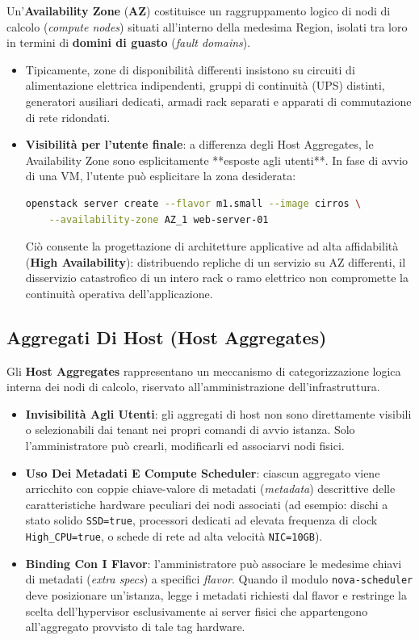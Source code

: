 \documentclass[11pt, a4paper]{article}
\begin{document}
Un'\textbf{Availability Zone} (\textbf{AZ}) costituisce un raggruppamento logico di nodi di calcolo (\emph{compute nodes}) situati all'interno della medesima Region, isolati tra loro in termini di \textbf{domini di guasto} (\emph{fault domains}).

\begin{itemize}
    \item Tipicamente, zone di disponibilità differenti insistono su circuiti di alimentazione elettrica indipendenti, gruppi di continuità (UPS) distinti, generatori ausiliari dedicati, armadi rack separati e apparati di commutazione di rete ridondati.
    \item \textbf{Visibilità per l'utente finale}: a differenza degli Host Aggregates, le Availability Zone sono esplicitamente **esposte agli utenti**. In fase di avvio di una VM, l'utente può esplicitare la zona desiderata:
    \begin{lstlisting}[language=bash]
openstack server create --flavor m1.small --image cirros \
    --availability-zone AZ_1 web-server-01
    \end{lstlisting}
    Ciò consente la progettazione di architetture applicative ad alta affidabilità (\textbf{High Availability}): distribuendo repliche di un servizio su AZ differenti, il disservizio catastrofico di un intero rack o ramo elettrico non compromette la continuità operativa dell'applicazione.
\end{itemize}

\subsection{Aggregati Di Host (Host Aggregates)}

Gli \textbf{Host Aggregates} rappresentano un meccanismo di categorizzazione logica interna dei nodi di calcolo, riservato all'amministrazione dell'infrastruttura.
\begin{itemize}
    \item \textbf{Invisibilità Agli Utenti}: gli aggregati di host non sono direttamente visibili o selezionabili dai tenant nei propri comandi di avvio istanza. Solo l'amministratore può crearli, modificarli ed associarvi nodi fisici.
    \item \textbf{Uso Dei Metadati E Compute Scheduler}: ciascun aggregato viene arricchito con coppie chiave-valore di metadati (\emph{metadata}) descrittive delle caratteristiche hardware peculiari dei nodi associati (ad esempio: dischi a stato solido \texttt{SSD=true}, processori dedicati ad elevata frequenza di clock \texttt{High\_CPU=true}, o schede di rete ad alta velocità \texttt{NIC=10GB}).
    \item \textbf{Binding Con I Flavor}: l'amministratore può associare le medesime chiavi di metadati (\emph{extra specs}) a specifici \emph{flavor}. Quando il modulo \texttt{nova-scheduler} deve posizionare un'istanza, legge i metadati richiesti dal flavor e restringe la scelta dell'hypervisor esclusivamente ai server fisici che appartengono all'aggregato provvisto di tale tag hardware.
\end{itemize}
\end{document}
